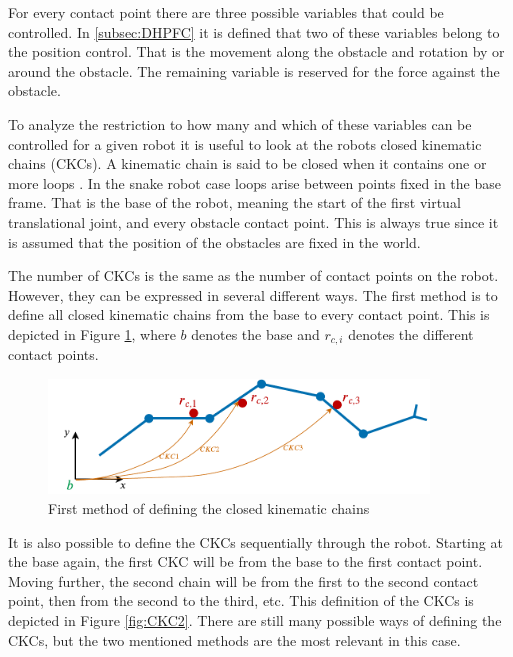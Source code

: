 For every contact point there are three possible variables that could be controlled. In \ref{subsec:DHPFC} it is defined that two of these variables belong to the position control. That is the movement along the obstacle and rotation by or around the obstacle. The remaining variable is reserved for the force against the obstacle.

To analyze the restriction to how many and which of these variables can be controlled for a given robot it is useful to look at the robots closed kinematic chains (CKCs). A kinematic chain is said to be closed when it contains one or more loops \cite{lynch2017modern}. In the snake robot case loops arise between points fixed in the base frame. That is the base of the robot, meaning the start of the first virtual translational joint, and every obstacle contact point. This is always true since it is assumed that the position of the obstacles are fixed in the world.

The number of CKCs is the same as the number of contact points on the robot. However, they can be expressed in several different ways. The first method is to define all closed kinematic chains from the base to every contact point. This is depicted in Figure \ref{fig:CKC1}, where $b$ denotes the base and $r_{c,i}$ denotes the different contact points.

\begin{figure}
    \centering
    \includegraphics[width=0.9\textwidth]{figures/theory/CKC1.pdf}
    \caption{First method of defining the closed kinematic chains}
    \label{fig:CKC1}
\end{figure}

It is also possible to define the CKCs sequentially through the robot. Starting at the base again, the first CKC will be from the base to the first contact point. Moving further, the second chain will be from the first to the second contact point, then from the second to the third, etc. This definition of the CKCs is depicted in Figure \ref{fig:CKC2}. There are still many possible ways of defining the CKCs, but the two mentioned methods are the most relevant in this case.

